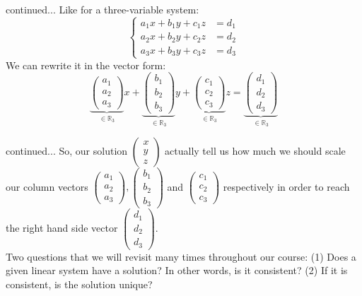 \documentclass[11pt]{beamer}
\theoremstyle{plain}
\begin{document}
\begin{frame}{continued...}
Like for a three-variable system:
$$
\begin{cases}
    a_1x+b_1y+c_1z&=d_1\\
    a_2x+b_2y+c_2z&=d_2\\
    a_3x+b_3y+c_3z&=d_3
\end{cases}
$$
We can rewrite it in the vector form:
$$
\underbrace{\begin{pmatrix}
    a_1\\a_2\\a_3
\end{pmatrix}}_{\in\mathbb R_3}x+
\underbrace{\begin{pmatrix}
    b_1\\b_2\\b_3
\end{pmatrix}}_{\in\mathbb R_3}y+
\underbrace{\begin{pmatrix}
    c_1\\c_2\\c_3
\end{pmatrix}}_{\in\mathbb R_3}z=
\underbrace{\begin{pmatrix}
    d_1\\d_2\\d_3
\end{pmatrix}}_{\in\mathbb R_3}
$$
\end{frame}
\begin{frame}{continued...}
So, our solution $\begin{pmatrix}
    x\\y\\z
\end{pmatrix}$ actually tell us how much we should scale our column vectors $\begin{pmatrix}
    a_1\\a_2\\a_3
\end{pmatrix},\begin{pmatrix}
    b_1\\b_2\\b_3
\end{pmatrix}$ and $\begin{pmatrix}
    c_1\\c_2\\c_3
\end{pmatrix}$ respectively in order to reach the right hand side vector $\begin{pmatrix}
    d_1\\d_2\\d_3
\end{pmatrix}$.\\
Two questions that we will revisit many times throughout our course: (1) Does a given linear system have a solution? In other words, is it consistent? (2) If it is consistent, is the solution unique?
\end{frame}
\end{document}
